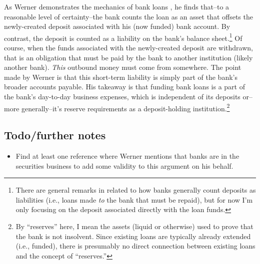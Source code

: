 As Werner demonstrates the mechanics of bank loans \cite{Werner2014}, he finds that--to a reasonable level of certainty--the bank counts the loan as an asset that offsets the newly-created deposit associated with his (now funded) bank account.  By contrast, the deposit is counted as a liability on the bank's balance sheet.\footnote{There are general remarks in \cite{Werner2014} related to how banks generally count deposits as liabilities (i.e., loans made {\it to} the bank that must be repaid), but for now I'm only focusing on the deposit associated directly with the loan funds.}  Of course, when the funds associated with the newly-created deposit are withdrawn, that is an obligation that must be paid by the bank to another institution (likely another bank).  {\it This} outbound money must come from somewhere.  The point made by Werner \cite{Werner2014} is that this short-term liability is simply part of the bank's broader accounts payable.  His takeaway is that funding bank loans is a part of the bank's day-to-day business expenses, which is independent of its deposits or--more generally--it's reserve requirements as a deposit-holding institution.\footnote{By ``reserves'' here, I mean the assets (liquid or otherwise) used to prove that the bank is not insolvent.  Since existing loans are typically already extended (i.e., funded), there is presumably no direct connection between existing loans and the concept of ``reserves.''} 



\subsection{Todo/further notes}
\begin{itemize}
    \item Find at least one reference where Werner mentions that banks are in the securities business to add some validity to this argument on his behalf.
\end{itemize}